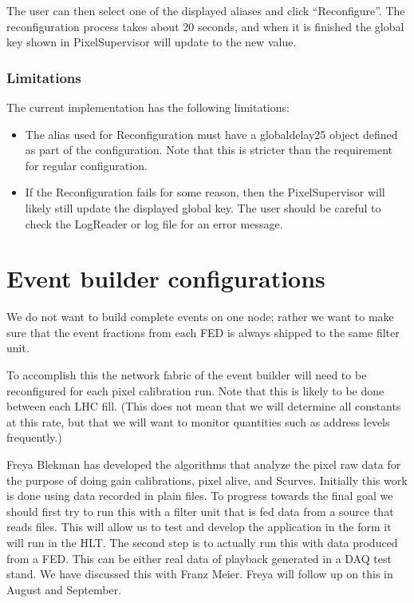 The user can then select one of the displayed aliases and click ``Reconfigure''. The reconfiguration process takes about 20 seconds, and when it is finished the global key shown in PixelSupervisor will update to the new value.

\subsubsection{Limitations}

The current implementation has the following limitations:

\begin{itemize}
\item The alias used for Reconfiguration must have a globaldelay25 object
defined as part of the configuration. Note that this is stricter than
the requirement for regular configuration.

\item If the Reconfiguration fails for some reason, then the PixelSupervisor will likely still update the displayed global key. The user should be careful to check the LogReader or log file for an error message.

\end{itemize}

\section{Event builder configurations}

We do not want to build complete events on one node; rather we want to
make sure that the event fractions from each FED is always shipped to
the same filter unit.

To accomplish this the network fabric of the event 
builder will need to be reconfigured for each pixel
calibration run. Note that this is likely to be done
between each LHC fill. (This does not mean that we
will determine all constants at this rate, but that
we will want to monitor quantities such as address
levels frequently.)

Freya Blekman has developed the algorithms that analyze 
the pixel raw data for the purpose of doing gain calibrations,
pixel alive, and Scurves. Initially this work is 
done using data recorded in plain files. To progress
towards the final goal we should first try to run this
with a filter unit that is fed data from a source
that reads files. This will allow us to test and develop
the application in the form it will run in the HLT. The
second step is to actually run this with data produced 
from a FED. This can be either real data of playback 
generated in a DAQ test stand. We have discussed this 
with Franz Meier. Freya will follow up on this in
August and September.

